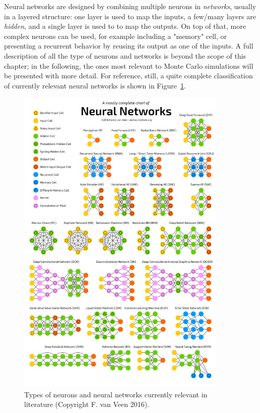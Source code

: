 Neural networks are designed by combining multiple neurons in \emph{networks}, usually in a layered structure: one layer is used to map the inputs, a few/many layers are \emph{hidden}, and a single layer is used to to map the outputs. On top of that, more complex neurons can be used, for example including a "memory" cell, or presenting a recurrent behavior by reusing its output as one of the inputs. A full description of all the type of neurons and networks is beyond the scope of this chapter; in the following, the ones most relevant to Monte Carlo simulations will be presented with more detail. For reference, still, a quite complete classification of currently relevant neural networks is shown in Figure~\ref{fig:types}.
\begin{figure}[h]
    \centering
    \includegraphics[width=0.9\textwidth]{images/types.png}
    \caption{Types of neurons and neural networks currently relevant in literature (Copyright F. van Veen 2016).}
    \label{fig:types}
\end{figure}

